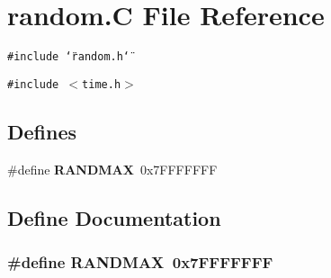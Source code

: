 \section{random.C File Reference}
\label{random_C}
{\tt \#include \char`\"{}random.h\char`\"{}}\par
{\tt \#include $<$time.h$>$}\par
\subsection*{Defines}
\begin{CompactItemize}
\item 
\#define {\bf RANDMAX}\ 0x7FFFFFFF
\end{CompactItemize}


\subsection{Define Documentation}
\subsubsection{\setlength{\rightskip}{0pt plus 5cm}\#define RANDMAX\ 0x7FFFFFFF}\label{random_C_a0}


